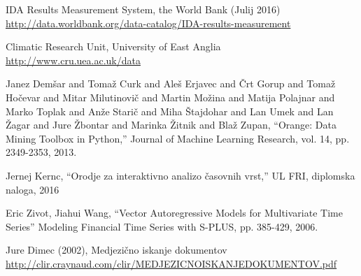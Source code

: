 \begin{thebibliography}{1}
 IDA Results Measurement System, the World Bank (Julij 2016)
\\ \url{http://data.worldbank.org/data-catalog/IDA-results-measurement}

 Climatic Research Unit, University of East Anglia
\\ \url{http://www.cru.uea.ac.uk/data}

 Janez Demšar and Tomaž Curk and Aleš Erjavec and Črt Gorup and Tomaž Hočevar and Mitar Milutinovič and Martin Možina and Matija Polajnar and Marko Toplak and Anže Starič and Miha Štajdohar and Lan Umek and Lan Žagar and Jure Žbontar and Marinka Žitnik and Blaž Zupan, ``Orange: Data Mining Toolbox in Python,'' Journal of Machine Learning Research, vol. 14, pp. 2349-2353, 2013.


 Jernej Kernc, ``Orodje za interaktivno analizo časovnih vrst,'' UL FRI, diplomska naloga, 2016


  Eric Zivot, Jiahui Wang, ``Vector Autoregressive Models for Multivariate Time Series'' Modeling Financial Time Series with S-PLUS, pp. 385-429, 2006.






 Jure Dimec (2002), Medjezično iskanje dokumentov 
\\ \url{http://clir.craynaud.com/clir/MEDJEZICNOISKANJEDOKUMENTOV.pdf}



\end{thebibliography}


